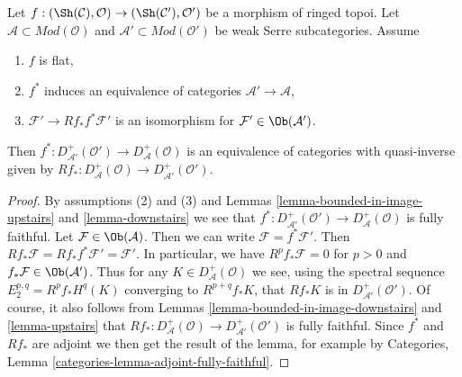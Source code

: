 \begin{lemma}
\label{lemma-equivalence-bounded}
Let $f : (\Sh(\mathcal{C}), \mathcal{O}) \to (\Sh(\mathcal{C}'), \mathcal{O}')$
be a morphism of ringed topoi.
Let $\mathcal{A} \subset \textit{Mod}(\mathcal{O})$
and $\mathcal{A}' \subset \textit{Mod}(\mathcal{O}')$
be weak Serre subcategories. Assume
\begin{enumerate}
\item $f$ is flat,
\item $f^*$ induces an equivalence of categories
$\mathcal{A}' \to \mathcal{A}$,
\item $\mathcal{F}' \to Rf_*f^*\mathcal{F}'$ is an isomorphism
for $\mathcal{F}' \in \Ob(\mathcal{A}')$.
\end{enumerate}
Then
$f^* : D_{\mathcal{A}'}^+(\mathcal{O}') \to D_\mathcal{A}^+(\mathcal{O})$
is an equivalence of categories with quasi-inverse given by
$Rf_* : D_\mathcal{A}^+(\mathcal{O}) \to D_{\mathcal{A}'}^+(\mathcal{O}')$.
\end{lemma}

\begin{proof}
By assumptions (2) and (3) and
Lemmas \ref{lemma-bounded-in-image-upstairs} and \ref{lemma-downstairs}
we see that
$f^* : D_{\mathcal{A}'}^+(\mathcal{O}') \to D_\mathcal{A}^+(\mathcal{O})$
is fully faithful.
Let $\mathcal{F} \in \Ob(\mathcal{A})$. Then we can write
$\mathcal{F} = f^*\mathcal{F}'$. Then
$Rf_*\mathcal{F} = Rf_* f^*\mathcal{F}' = \mathcal{F}'$.
In particular, we have $R^pf_*\mathcal{F} = 0$ for $p > 0$
and $f_*\mathcal{F} \in \Ob(\mathcal{A}')$.
Thus for any $K \in D^+_\mathcal{A}(\mathcal{O})$ we see,
using the spectral sequence $E_2^{p, q} = R^pf_*H^q(K)$
converging to $R^{p + q}f_*K$,
that $Rf_*K$ is in $D^+_{\mathcal{A}'}(\mathcal{O}')$.
Of course, it also follows from
Lemmas \ref{lemma-bounded-in-image-downstairs} and \ref{lemma-upstairs}
that $Rf_* : D_\mathcal{A}^+(\mathcal{O}) \to D_{\mathcal{A}'}^+(\mathcal{O}')$
is fully faithful. Since $f^*$ and $Rf_*$ are adjoint
we then get the result of the lemma, for example by
Categories, Lemma \ref{categories-lemma-adjoint-fully-faithful}.
\end{proof}


